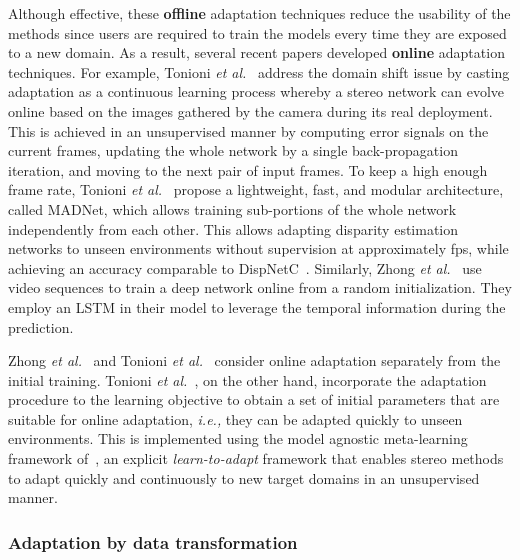 \documentclass[10pt,journal,compsoc]{IEEEtran}
\newcommand{\ie}{\emph{i.e., }}
\newcommand{\etal}{\emph{et al.}}
\begin{document}
Although effective, these \textbf{offline} adaptation techniques reduce the usability of the methods since users are required to train the models every time they are exposed to a new domain. As a result, several recent papers developed \textbf{online} adaptation techniques.  For example,  Tonioni \etal~\cite{tonioni2019real} address the domain shift issue by casting adaptation as a continuous learning process whereby a stereo network can evolve online based on the images gathered by the camera during its real deployment.  This is achieved in an unsupervised manner by computing error signals on the current frames, updating the whole network by a single back-propagation iteration, and moving to the next pair of input frames. To keep a high enough frame rate, Tonioni \etal~\cite{tonioni2019real}  propose a lightweight, fast, and modular architecture, called MADNet, which allows training sub-portions of the whole network independently from each other. This allows  adapting disparity estimation  networks to unseen environments without supervision at approximately  fps, while achieving an accuracy comparable to DispNetC~\cite{mayer2016large}.  Similarly, Zhong \etal~\cite{zhong2018open} use video sequences to train a deep network online from a random initialization. They employ an LSTM in their model to leverage the temporal information during the prediction.  

Zhong \etal~\cite{zhong2018open} and Tonioni \etal~\cite{tonioni2019real} consider  online adaptation separately from the initial training. Tonioni \etal~\cite{tonioni2019learning}, on the other hand, incorporate the adaptation procedure to the learning objective to obtain a set of initial parameters that are suitable for online adaptation, \ie they can be adapted quickly to unseen environments. This is implemented using    the model agnostic meta-learning framework of~\cite{finn2017model},  an explicit \emph{learn-to-adapt} framework that enables  stereo methods to adapt quickly and continuously  to new target domains in an unsupervised manner.  



\subsubsection{Adaptation by data transformation}
\label{sec:adaptation_datatransformation}
\end{document}
